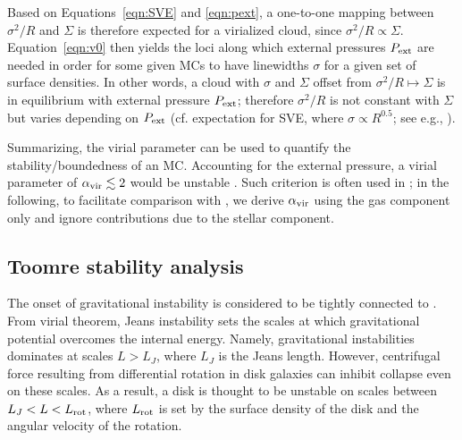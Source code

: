 \IfFileExists{emulateapjlegacy.cls}{\documentclass[iop]{emulateapjlegacy}}{\documentclass[iop]{emulateapj}}
\begin{document}
Based on Equations~\ref{eqn:SVE} and \ref{eqn:pext}, a one-to-one mapping between $\sigma^2/R$ and $\Sigma$ is therefore expected for a virialized cloud, since $\sigma^2/R\propto\Sigma$. Equation~\ref{eqn:v0} then yields the loci along which external pressures $P_{\rm ext}$ are needed in order for some given MCs to have linewidths $\sigma$ for a given set of surface densities. In other words, a cloud with $\sigma$ and $\Sigma$ offset from $\sigma^2/R\mapsto\Sigma$ is in equilibrium with external pressure $P_{\rm ext}$; therefore $\sigma^2/R$ is not constant with $\Sigma$ but varies depending on $P_{\rm ext}$ (cf. expectation for SVE, where $\sigma\propto R^{0.5}$; see e.g., \citealt{Heyer09a, Hughes10a, Hughes13b, Meidt13a}).

Summarizing, the virial parameter can be used to quantify the stability/boundedness of an MC. Accounting for the external pressure, a virial parameter of $\alpha_{\rm vir}\lesssim2$ would be unstable \citep{bertoldi:1992}.
%
Such criterion is often used in \obs \citep[see e.g., ][]{Kauffmann17b}; in the following, to facilitate comparison with \obs, we derive $\alpha_{\rm vir}$ using the gas component only and ignore contributions due to the stellar component.

\subsection{Toomre stability analysis}\label{sec:Q}

The onset of gravitational instability is considered to be tightly connected to \SF \citep[e.g.,][]{Kennicutt89a, Wang94a, Li05b, Li06a}. From virial theorem, Jeans instability sets the scales at which gravitational potential overcomes the internal energy. Namely, gravitational instabilities dominates at scales $L > L_J$, where $L_J$ is the Jeans length. However, centrifugal force resulting from differential rotation in disk galaxies can inhibit collapse even on these scales. As a result, a disk is thought to be unstable on scales between $L_J < L < L_{\rm rot}$, where $L_{\rm rot}$ is set by the surface density of the disk and the angular velocity of the rotation.
\end{document}
